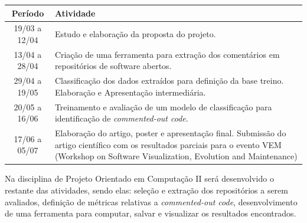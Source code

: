 \documentclass{abnt}
\begin{document}
\begin{table}[ht]
  \centering
  \label{tab:Table1}
  \smallskip
  \begin{tabular}{cp{11cm}}
  Período & Atividade\\[0.5ex]
  \hline
  19/03 a 12/04 & Estudo e elaboração da proposta do projeto. \\[0.5ex]

  13/04 a 28/04 & Criação de uma ferramenta para extração dos comentários em 
  repositórios de software abertos.\\[0.5ex]
  
  29/04 a 19/05 & Classificação dos dados extraídos para definição da base 
  treino. Elaboração e Apresentação intermediária. \\[0.5ex]

  20/05 a 16/06 & Treinamento e avaliação de um modelo de classificação para 
  identificação de \textit{commented-out code}. \\[0.5ex]

  17/06 a 05/07 & Elaboração do artigo, poster e apresentação final. Submissão 
  do artigo científico com os resultados parciais para o evento VEM 
  (Workshop on Software Visualization, Evolution and Maintenance) \\[0.5ex]
  \end{tabular}
  \end{table}

  Na disciplina de Projeto Orientado em Computação II será desenvolvido
  o restante das atividades, sendo elas: seleção e extração dos repositórios 
  a serem avaliados, definição de métricas relativas a \textit{commented-out code},
  desenvolvimento de uma ferramenta para computar, salvar e visualizar os 
  resultados encontrados.



\end{document}
